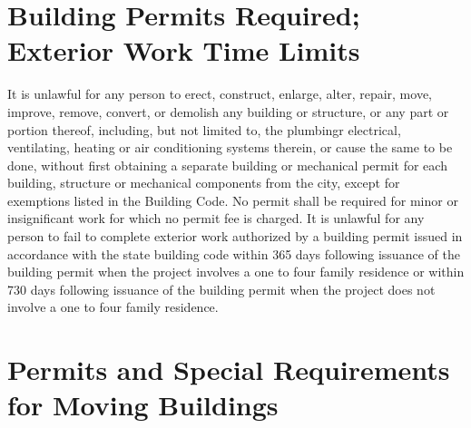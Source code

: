 \section{Building Permits Required; Exterior Work Time Limits}
It is unlawful for any person to erect, construct, enlarge, alter, repair, move, improve, remove, convert, or demolish any building or structure, or any part or portion thereof, including, but not limited to, the plumbingr electrical, ventilating, heating or air conditioning systems therein, or cause the same to be done, without first obtaining a separate building or mechanical permit for each building, structure or mechanical components from the city, except for exemptions listed in the Building Code. No permit shall be required for minor or insignificant work for which no permit fee is charged. It is unlawful for any person to fail to complete exterior work authorized by a building permit issued in accordance with the state building code within 365 days following issuance of the building permit when the project involves a one to four family residence or within 730 days following issuance of the building permit when the project does not involve a one to four family residence.

\section{Permits and Special Requirements for Moving Buildings}
